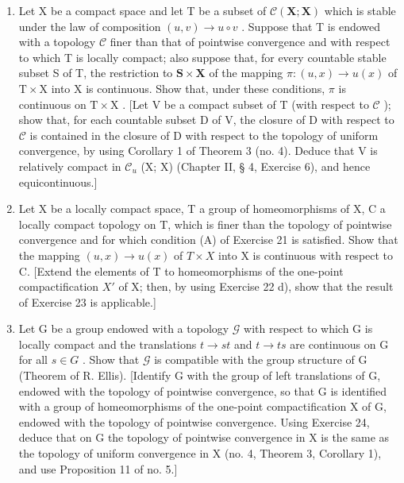 \begin{enumerate}
\def\labelenumi{\arabic{enumi})}
\setcounter{enumi}{22}
\item
  Let X be a compact space and let T be a subset of \(\mathcal{C}(\mathbf{X};\mathbf{X})\) which is stable under the law of composition \((u,v)\to u\circ v\) . Suppose that T is endowed with a topology \(\mathcal{C}\) finer than that of pointwise convergence and with respect to which T is locally compact; also suppose that, for every countable stable subset S of T, the restriction to \(\mathbf{S}\times \mathbf{X}\) of the mapping \(\pi : (u,x)\to u(x)\) of \(\mathrm{T}\times \mathrm{X}\) into X is continuous. Show that, under these conditions, \(\pi\) is continuous on \(\mathrm{T}\times \mathrm{X}\) . {[}Let V be a compact subset of T (with respect to \(\mathcal{C}\) ); show that, for each countable subset D of V, the closure of D with respect to \(\mathcal{C}\) is contained in the closure of D with respect to the topology of uniform convergence, by using Corollary 1 of Theorem 3 (no. 4). Deduce that V is relatively compact in \(\mathcal{C}_u\) (X; X) (Chapter II, § 4, Exercise 6), and hence equicontinuous.{]}
\item
  Let X be a locally compact space, T a group of homeomorphisms of X, C a locally compact topology on T, which is finer than the topology of pointwise convergence and for which condition (A) of Exercise 21 is satisfied. Show that the mapping \((u, x) \to u(x)\) of \(T \times X\) into X is continuous with respect to C. {[}Extend the elements of T to homeomorphisms of the one-point compactification \(X'\) of X; then, by using Exercise 22 d), show that the result of Exercise 23 is applicable.{]}
\item
  Let G be a group endowed with a topology \(\mathcal{G}\) with respect to which G is locally compact and the translations \(t \to st\) and \(t \to ts\) are continuous on G for all \(s \in G\) . Show that \(\mathcal{G}\) is compatible with the group structure of G (Theorem of R. Ellis). {[}Identify G with the group of left translations of G, endowed with the topology of pointwise convergence, so that G is identified with a group of homeomorphisms of the one-point compactification X of G, endowed with the topology of pointwise convergence. Using Exercise 24, deduce that on G the topology of pointwise convergence in X is the same as the topology of uniform convergence in X (no. 4, Theorem 3, Corollary 1), and use Proposition 11 of no. 5.{]}
\end{enumerate}

